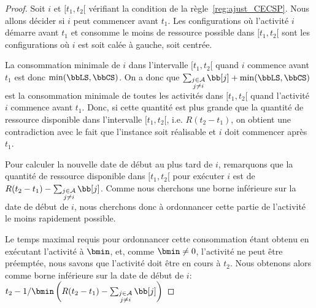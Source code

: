 \begin{proof}
  Soit $i$ et $[t_1,t_2[$ vérifiant la condition de la
  règle~\ref{reg:ajust_CECSP}. Nous allons décider si $i$ peut commencer
  avant $t_1$. Les configurations où l'activité $i$ démarre avant $t_1$
  et consomme le moins de ressource possible dans $[t_1,t_2[$ sont les
  configurations où $i$ est soit calée à gauche, soit centrée.

  La consommation minimale de $i$ dans l'intervalle $[t_1,t_2[$ quand
  $i$ commence avant $t_1$ est donc $\min( \bbLS, \bbCS)$. On a donc que
  $\sum_{\substack{j \in \A\\ j\neq i}} \bb[j] + \min( \bbLS, \bbCS) $
  est la consommation minimale de toutes les activités dans $[t_1,t_2[$
  quand l'activité $i$ commence avant $t_1$. Donc, si cette quantité est
  plus grande que la quantité de ressource disponible dans l'intervalle
  $[t_1,t_2[$, i.e. $R(t_2-t_1)$, on obtient une contradiction avec le
  fait que l'instance soit réalisable et $i$ doit commencer après $t_1$.

  Pour calculer la nouvelle date de début au plus tard de $i$,
  remarquons que la quantité de ressource disponible dans $[t_1,t_2[$
  pour exécuter $i$ est de $R(t_2-t_1) -\sum_{\substack{j \in \A\\
      j\neq i}} \bb[j]$. Comme nous cherchons une borne inférieure sur la date de
  début de $i$, nous cherchons donc à ordonnancer cette partie de
  l'activité le moins rapidement possible. 

  Le temps maximal requis pour ordonnancer cette consommation étant
  obtenu en exécutant l'activité à $\bmin$, et, comme $\bmin \neq 0$,
  l'activité ne peut être préemptée, nous savons que l'activité doit
  être en cours à $t_2$. Nous obtenons alors comme borne inférieure sur
  la date de début de $i$:
  $t_2 - 1/\bmin \left(R (t_2-t_1) -\sum_{\substack{j
        \in \A \\ j \neq i}} \bb[j] \right) $
\end{proof}

